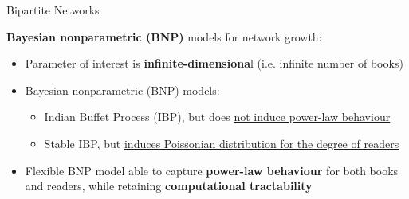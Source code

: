 \documentclass[aspectratio=169,xcolor=dvipsnames]{beamer}
\begin{document}
\begin{frame}{Bipartite Networks}
\begin{center}
\begin{tikzpicture}[scale = 1.6]
    \end{tikzpicture} 
    \end{center}
\vspace{5pt}
\textbf{Bayesian nonparametric (BNP)} models for network growth:
    \begin{itemize}
        \item Parameter of interest is \textbf{infinite-dimensiona}l (i.e. infinite number of books)
        \item Bayesian nonparametric (BNP) models:
        \begin{itemize}
            \item  Indian Buffet Process (IBP), but does \underline{not induce power-law behaviour}
            \item  Stable IBP, but \underline{induces Poissonian distribution for the degree of readers}
        \end{itemize}
        \item Flexible BNP model able to capture \textbf{power-law behaviour} for both books and readers, while retaining \textbf{computational tractability}
    \end{itemize}

\end{frame}
\end{document}
